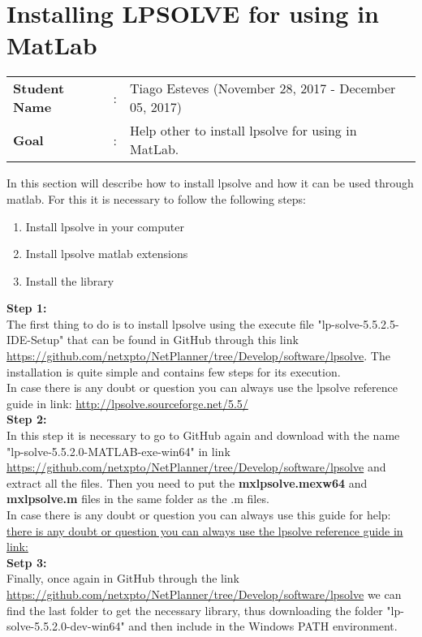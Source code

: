\clearpage

\section{Installing LPSOLVE for using in MatLab}
\begin{tcolorbox}	
\begin{tabular}{p{2.75cm} p{0.2cm} p{10.5cm}} 	
\textbf{Student Name}  &:& Tiago Esteves        (November 28, 2017 - December 05, 2017)\\
\textbf{Goal}          &:& Help other to install lpsolve for using in MatLab.
\end{tabular}
\end{tcolorbox}


In this section will describe how to install lpsolve and how it can be used through matlab. For this it is necessary to follow the following steps:
\begin{enumerate}
  \item Install lpsolve in your computer
  \item Install lpsolve matlab extensions
  \item Install the library
\end{enumerate}

\textbf{Step 1:}\\
The first thing to do is to install lpsolve using the execute file "lp-solve-5.5.2.5-IDE-Setup" that can be found in GitHub through this link \url{https://github.com/netxpto/NetPlanner/tree/Develop/software/lpsolve}. The installation is quite simple and contains few steps for its execution. \\
In case there is any doubt or question you can always use the lpsolve reference guide in link: \url{http://lpsolve.sourceforge.net/5.5/} \\

\textbf{Step 2:}\\
In this step it is necessary to go to GitHub again and download with the name "lp-solve-5.5.2.0-MATLAB-exe-win64" in link \url{https://github.com/netxpto/NetPlanner/tree/Develop/software/lpsolve} and extract all the files. Then you need to put the \textbf{mxlpsolve.mexw64} and \textbf{mxlpsolve.m} files in the same folder as the .m files. \\
In case there is any doubt or question you can always use this guide for help: \url{there is any doubt or question you can always use the lpsolve reference guide in link:} \\

\textbf{Setp 3:}\\
Finally, once again in GitHub through the link \url{https://github.com/netxpto/NetPlanner/tree/Develop/software/lpsolve} we can find the last folder to get the necessary library, thus downloading the folder "lp-solve-5.5.2.0-dev-win64" and then include in the Windows PATH environment. \\

